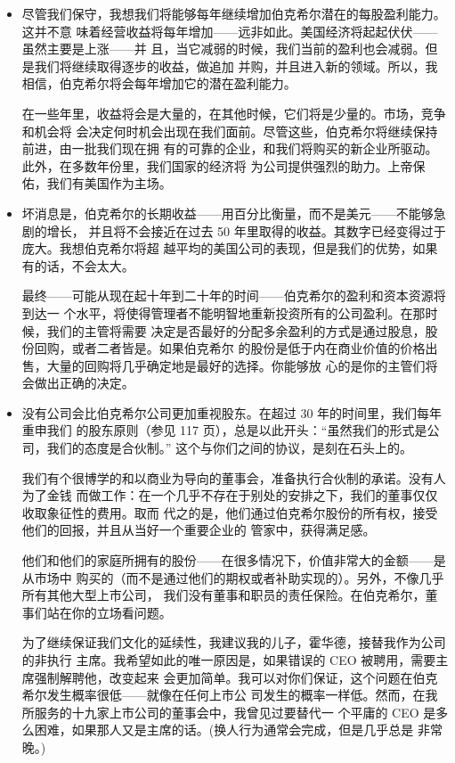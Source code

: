 \documentclass[UTF8,a4paper,zihao=-4,fontset = windows]{ctexart} %
\begin{document}
\begin{itemize}
    \item \noindent 尽管我们保守，我想我们将能够每年继续增加伯克希尔潜在的每股盈利能力。这并不意
味着经营收益将每年增加——远非如此。美国经济将起起伏伏——虽然主要是上涨——并
且，当它减弱的时候，我们当前的盈利也会减弱。但是我们将继续取得逐步的收益，做追加
并购，并且进入新的领域。所以，我相信，伯克希尔将会每年增加它的潜在盈利能力。

在一些年里，收益将会是大量的，在其他时候，它们将是少量的。市场，竞争和机会将
会决定何时机会出现在我们面前。尽管这些，伯克希尔将继续保持前进，由一批我们现在拥
有的可靠的企业，和我们将购买的新企业所驱动。此外，在多数年份里，我们国家的经济将
为公司提供强烈的助力。上帝保佑，我们有美国作为主场。

    \item \noindent 坏消息是，伯克希尔的长期收益——用百分比衡量，而不是美元——不能够急剧的增长，
并且将不会接近在过去 50 年里取得的收益。其数字已经变得过于庞大。我想伯克希尔将超
越平均的美国公司的表现，但是我们的优势，如果有的话，不会太大。

最终——可能从现在起十年到二十年的时间——伯克希尔的盈利和资本资源将到达一
个水平，将使得管理者不能明智地重新投资所有的公司盈利。在那时候，我们的主管将需要
决定是否最好的分配多余盈利的方式是通过股息，股份回购，或者二者皆是。如果伯克希尔
的股份是低于内在商业价值的价格出售，大量的回购将几乎确定地是最好的选择。你能够放
心的是你的主管们将会做出正确的决定。

 \item \noindent 没有公司会比伯克希尔公司更加重视股东。在超过 30 年的时间里，我们每年重申我们
的股东原则（参见 117 页），总是以此开头：“虽然我们的形式是公司，我们的态度是合伙制。”
这个与你们之间的协议，是刻在石头上的。

我们有个很博学的和以商业为导向的董事会，准备执行合伙制的承诺。没有人为了金钱
而做工作：在一个几乎不存在于别处的安排之下，我们的董事仅仅收取象征性的费用。取而
代之的是，他们通过伯克希尔股份的所有权，接受他们的回报，并且从当好一个重要企业的
管家中，获得满足感。

他们和他们的家庭所拥有的股份——在很多情况下，价值非常大的金额——是从市场中
购买的（而不是通过他们的期权或者补助实现的）。另外，不像几乎所有其他大型上市公司，
我们没有董事和职员的责任保险。在伯克希尔，董事们站在你的立场看问题。

为了继续保证我们文化的延续性，我建议我的儿子，霍华德，接替我作为公司的非执行
主席。我希望如此的唯一原因是，如果错误的 CEO 被聘用，需要主席强制解聘他，改变起来
会更加简单。我可以对你们保证，这个问题在伯克希尔发生概率很低——就像在任何上市公
司发生的概率一样低。然而，在我所服务的十九家上市公司的董事会中，我曾见过要替代一
个平庸的 CEO 是多么困难，如果那人又是主席的话。(换人行为通常会完成，但是几乎总是
非常晚。)


\end{itemize}
\end{document}
